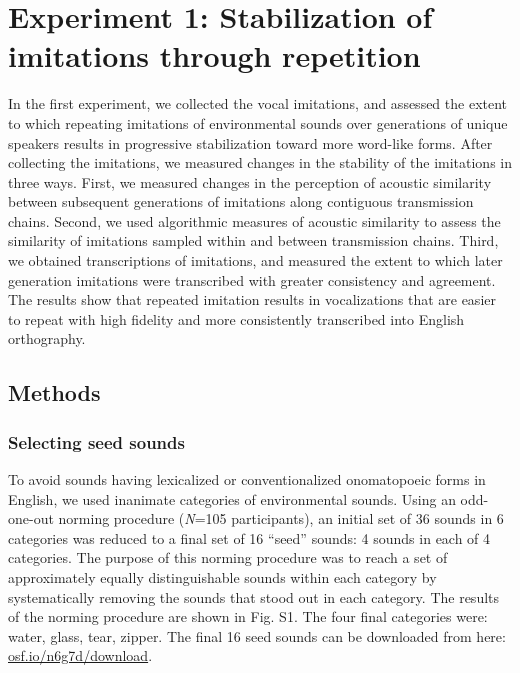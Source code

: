 \documentclass[english,floatsintext,man]{apa6}
\theoremstyle{definition}
\theoremstyle{definition}
\theoremstyle{definition}
\theoremstyle{remark}
\begin{document}
\hypertarget{experiment-1-stabilization-of-imitations-through-repetition}{%
\section{Experiment 1: Stabilization of imitations through
repetition}\label{experiment-1-stabilization-of-imitations-through-repetition}}

In the first experiment, we collected the vocal imitations, and assessed
the extent to which repeating imitations of environmental sounds over
generations of unique speakers results in progressive stabilization
toward more word-like forms. After collecting the imitations, we
measured changes in the stability of the imitations in three ways.
First, we measured changes in the perception of acoustic similarity
between subsequent generations of imitations along contiguous
transmission chains. Second, we used algorithmic measures of acoustic
similarity to assess the similarity of imitations sampled within and
between transmission chains. Third, we obtained transcriptions of
imitations, and measured the extent to which later generation imitations
were transcribed with greater consistency and agreement. The results
show that repeated imitation results in vocalizations that are easier to
repeat with high fidelity and more consistently transcribed into English
orthography.

\hypertarget{methods}{%
\subsection{Methods}\label{methods}}

\hypertarget{selecting-seed-sounds}{%
\subsubsection{Selecting seed sounds}\label{selecting-seed-sounds}}

To avoid sounds having lexicalized or conventionalized onomatopoeic
forms in English, we used inanimate categories of environmental sounds.
Using an odd-one-out norming procedure (\emph{N}=105 participants), an
initial set of 36 sounds in 6 categories was reduced to a final set of
16 \enquote{seed} sounds: 4 sounds in each of 4 categories. The purpose
of this norming procedure was to reach a set of approximately equally
distinguishable sounds within each category by systematically removing
the sounds that stood out in each category. The results of the norming
procedure are shown in Fig. S1. The four final categories were: water,
glass, tear, zipper. The final 16 seed sounds can be downloaded from
here: \href{https://osf.io/n6g7d/download}{osf.io/n6g7d/download}.
\end{document}
